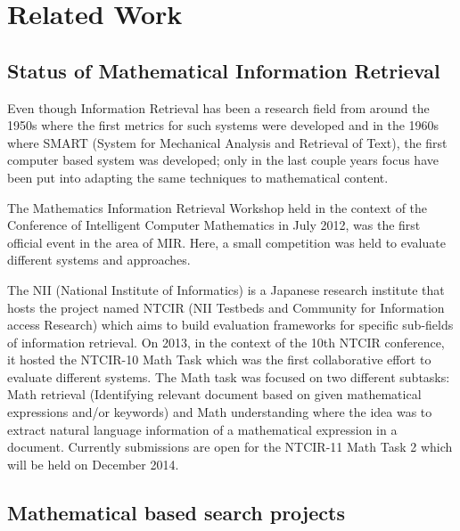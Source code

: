 \chapter{Related Work}
\label{chap-related_work}
\section{Status of Mathematical Information Retrieval}
Even though Information Retrieval has been a research field from around the 1950s where the first metrics for such systems were developed and in the 1960s where SMART (System for Mechanical Analysis and Retrieval of Text), the first computer based system was developed; only in the last couple years focus have been put into adapting the same techniques to mathematical content. 

The Mathematics Information Retrieval Workshop\cite{mir_workshop} held in the context of the Conference of Intelligent Computer Mathematics in July 2012, was the first official event in the area of MIR. Here, a small competition was held to evaluate different systems and approaches.

The NII\cite{nii} (National Institute of Informatics) is a Japanese research institute that hosts the project named NTCIR (NII Testbeds and Community for Information access Research) which aims to build evaluation frameworks for specific sub-fields of information retrieval. On 2013, in the context of the 10th NTCIR conference, it hosted the NTCIR-10 Math Task \cite{math_task} which was the first collaborative effort to evaluate different systems. The Math task was focused on two different subtasks: Math retrieval (Identifying relevant document based on given mathematical expressions and/or keywords) and Math understanding where the idea was to extract natural language information of a mathematical expression in a document. Currently submissions are open for the NTCIR-11 Math Task 2 which will be held on December 2014.

\section{Mathematical based search projects}

